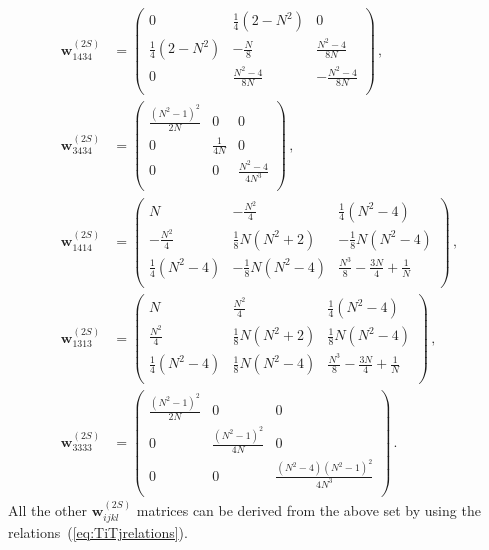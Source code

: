 \documentclass[a4paper,11pt]{article}
\newcommand{\bfw}{\bm{w}}
\numberwithin{equation}{section}
\begin{document}
\begin{subequations}
\begin{align}
    \bfw_{1434}^{(2S)}  & = 
\left(
\begin{array}{ccc}
 0 & \frac{1}{4} \left(2-N^2\right) & 0 \\
 \frac{1}{4} \left(2-N^2\right) & -\frac{N}{8} & \frac{N^2-4}{8 N} \\
 0 & \frac{N^2-4}{8 N} & -\frac{N^2-4}{8 N} \\
\end{array}
\right)
    \,,\\[0.5em]
    \bfw_{3434}^{(2S)}  & = 
\left(
\begin{array}{ccc}
 \frac{\left(N^2-1\right)^2}{2 N} & 0 & 0 \\
 0 & \frac{1}{4 N} & 0 \\
 0 & 0 & \frac{N^2-4}{4 N^3} \\
\end{array}
\right)
    \,,\\[0.5em]
    \bfw_{1414}^{(2S)}  & = 
\left(
\begin{array}{ccc}
 N & -\frac{N^2}{4} & \frac{1}{4} \left(N^2-4\right) \\
 -\frac{N^2}{4} & \frac{1}{8} N \left(N^2+2\right) & -\frac{1}{8} N
\left(N^2-4\right) \\
 \frac{1}{4} \left(N^2-4\right) & -\frac{1}{8} N \left(N^2-4\right) &
\frac{N^3}{8}-\frac{3 N}{4}+\frac{1}{N} \\
\end{array}
\right)
    \,,\\[0.5em]
    \bfw_{1313}^{(2S)}  & = 
\left(
\begin{array}{ccc}
 N & \frac{N^2}{4} & \frac{1}{4} \left(N^2-4\right) \\
 \frac{N^2}{4} & \frac{1}{8} N \left(N^2+2\right) & \frac{1}{8} N
\left(N^2-4\right) \\
 \frac{1}{4} \left(N^2-4\right) & \frac{1}{8} N \left(N^2-4\right) &
\frac{N^3}{8}-\frac{3 N}{4}+\frac{1}{N} \\
\end{array}
\right)
    \,,\\[0.5em]
    \bfw_{3333}^{(2S)}  & = 
\left(
\begin{array}{ccc}
 \frac{\left(N^2-1\right)^2}{2 N} & 0 & 0 \\
 0 & \frac{\left(N^2-1\right)^2}{4 N} & 0 \\
 0 & 0 & \frac{\left(N^2-4\right) \left(N^2-1\right)^2}{4 N^3} \\
\end{array}
\right)
    \,.
\end{align}
\end{subequations}
%
All the other $\bfw_{ijkl}^{(2S)}$ matrices can be derived from the above set
by using the relations~(\ref{eq:TiTjrelations}).
\end{document}
